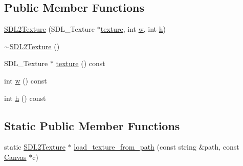 \subsection*{Public Member Functions}
\begin{DoxyCompactItemize}
\item 
\hyperlink{classijengine_1_1SDL2Texture_a4eb052ac3a431cc81cd2feba6aa65e67}{S\-D\-L2\-Texture} (S\-D\-L\-\_\-\-Texture $\ast$\hyperlink{classijengine_1_1SDL2Texture_ab2b7be6a96eb385b9695f358283f006c}{texture}, int \hyperlink{classijengine_1_1SDL2Texture_a94b43ffad7f1ea5ac74165e59085ffce}{w}, int \hyperlink{classijengine_1_1SDL2Texture_a5202ccb0ca2cd152fd3597b45235556e}{h})
\item 
\hyperlink{classijengine_1_1SDL2Texture_a18eb28859d46b9a918ff27b2f8a37501}{$\sim$\-S\-D\-L2\-Texture} ()
\item 
S\-D\-L\-\_\-\-Texture $\ast$ \hyperlink{classijengine_1_1SDL2Texture_ab2b7be6a96eb385b9695f358283f006c}{texture} () const 
\item 
int \hyperlink{classijengine_1_1SDL2Texture_a94b43ffad7f1ea5ac74165e59085ffce}{w} () const 
\item 
int \hyperlink{classijengine_1_1SDL2Texture_a5202ccb0ca2cd152fd3597b45235556e}{h} () const 
\end{DoxyCompactItemize}
\subsection*{Static Public Member Functions}
\begin{DoxyCompactItemize}
\item 
static \hyperlink{classijengine_1_1SDL2Texture}{S\-D\-L2\-Texture} $\ast$ \hyperlink{classijengine_1_1SDL2Texture_a2685a9df8d7152bc132990dea3ffe813}{load\-\_\-texture\-\_\-from\-\_\-path} (const string \&path, const \hyperlink{classijengine_1_1Canvas}{Canvas} $\ast$c)
\end{DoxyCompactItemize}


